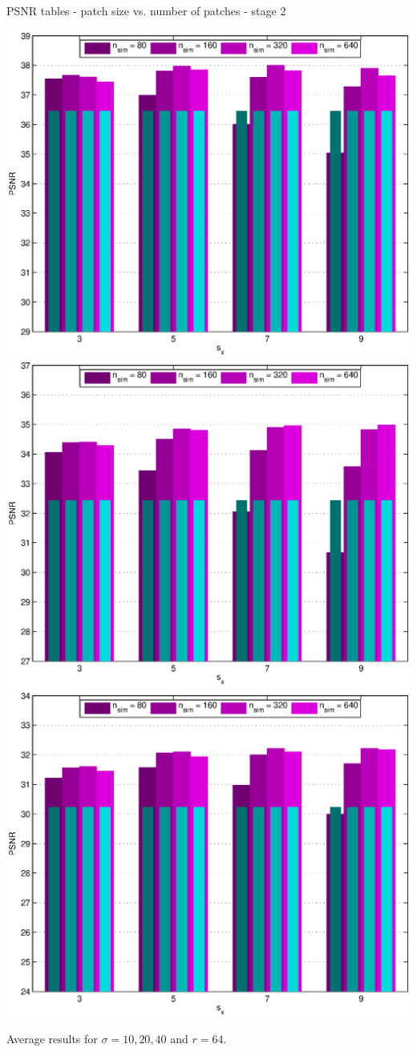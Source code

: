 \documentclass[mathserif, 8pt]{beamer}
\makeatletter
\newcounter{multipleslide}
\newcommand{\restoreframe}{%
\patchcmd{\beamer@@tmpl@footline}%
	{\themultipleslide}%
	{\insertframenumber}%
	{}%
	{}%
\setcounter{framenumber}{\value{multipleslide}}%
}
\makeatother
\begin{document}
\begin{frame}{PSNR tables - patch size vs. number of patches - stage 2}
	\begin{center}
		\includegraphics[width=.33\textwidth]{psnr_px2-np2-bars_2r64_s10_average.eps}%
		\includegraphics[width=.33\textwidth]{psnr_px2-np2-bars_2r64_s20_average.eps}%
		\includegraphics[width=.33\textwidth]{psnr_px2-np2-bars_2r64_s40_average.eps}
	\end{center}
	\begin{center}
	Average results for $\sigma = 10, 20, 40$ and $r = 64$.
	\end{center}
\end{frame}
\restoreframe
\end{document}
